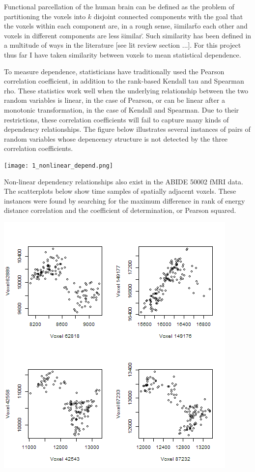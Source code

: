 
Functional parcellation of the human brain can be defined as the problem
of partitioning the voxels into $k$ disjoint connected components with
the goal that the voxels within each component are, in a rough sense,
\"similar\" to each other and voxels in different components are less
\"similar\". Such similarity has been defined in a multitude of ways in
the literature [see lit review section ...]. For this project thus far I
have taken similarity between voxels to mean statistical dependence.

To measure dependence, statisticians have traditionally used the Pearson
correlation coefficient, in addition to the rank-based Kendall tau and
Spearman rho. These statistics work well when the underlying
relationship between the two random variables is linear, in the case of
Pearson, or can be linear after a monotonic transformation, in the case
of Kendall and Spearman. Due to their restrictions, these correlation
coefficients will fail to capture many kinds of dependency
relationships. The figure below illustrates several instances of pairs
of random variables whose depencency structure is not detected by the
three correlation coefficients.

\texttt{[image: 1\_nonlinear\_depend.png]}

Non-linear dependency relationships also exist in the ABIDE 50002 fMRI
data. The scatterplots below show time samples of spatially adjacent
voxels. These instances were found by searching for the maximum
difference in rank of energy distance correlation and the coefficient
of determination, or Pearson squared.

\includegraphics[scale = 0.7]{1_nonlinear_ABIDE_50002.png}

